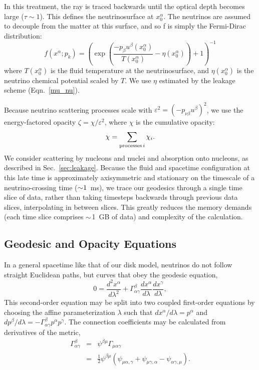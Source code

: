 In this treatment, the ray is traced backwards until the optical depth becomes
large ($\tau\sim1$). This defines the neutrinosurface at $x_0^\alpha$. The
neutrinos are assumed to decouple from the matter at this surface, and so f
is simply the Fermi-Dirac distribution:
\begin{equation}
  \label{eqn:f_fermi_dirac}
  f(x^\alpha;p_k) =
  \left(\exp\left(\frac{-p_\beta u^\beta(x_0^\alpha)}{T(x_0^\alpha)}
  -\eta(x_0^\alpha) \right)+1\right)^{-1}
\end{equation}
where $T(x_0^\alpha)$ is the fluid temperature at the neutrinosurface, and
$\eta(x_0^\alpha)$ is the neutrino chemical potential scaled by $T$.
We use $\eta$ estimated by the leakage scheme (Eqn.~\ref{mu_nu}).

Because neutrino scattering processes scale with
$\varepsilon^2=(-p_{\nu\beta} u^\beta)^2$,
we use the energy-factored opacity $\zeta=\chi/\varepsilon^2$, where $\chi$ is
the cumulative opacity:
\begin{equation}
  \chi = \sum\limits_{{\rm processes}\, i} \chi_i.
\end{equation}
We consider scattering by nucleons and nuclei and absorption onto nucleons,
as described in Sec.~\ref{sec:leakage}.
Because the fluid and spacetime configuration at this late time is approximately
axisymmetric and stationary on the timescale of a neutrino-crossing time
($\mathord{\sim}1$~ms), we trace our geodesics through a single time slice of data,
rather than taking timesteps backwards through previous data slices,
interpolating in between slices. This greatly reduces the memory demands (each
time slice comprises $\mathord{\sim}$1~GB of data) and complexity of the calculation.

\subsection{Geodesic and Opacity Equations}
\label{ssec:geodesic}
In a general spacetime like that of our disk model, neutrinos do not follow
straight Euclidean paths, but curves that obey the geodesic equation,
\begin{equation}
  \label{eqn:geodesic}
  0=\frac{d^2x^\alpha}{d\lambda^2} + \Gamma^\beta_{\alpha\gamma}
  \frac{dx^\alpha}{d\lambda}\frac{dx^\gamma}{d\lambda},
\end{equation}
This second-order equation may be split into two coupled first-order equations
by choosing the affine parameterization $\lambda$ such that
$dx^\alpha/d\lambda=p^\alpha$ and
$dp^\beta/d\lambda=-\Gamma^\beta_{\alpha\gamma}p^\alpha p^\gamma$.
The connection coefficients may be calculated from derivatives of the metric,
\begin{eqnarray}
  \label{eqn:christoffel}
  \Gamma^\beta_{\alpha\gamma}
  &=& \psi^{\beta\mu}\Gamma_{\mu\alpha\gamma} \nonumber \\
  &=& \frac{1}{2} \psi^{\beta\mu}
  (\psi_{\mu\alpha,\gamma} + \psi_{\mu\gamma,\alpha} - \psi_{\alpha\gamma,\mu}).
\end{eqnarray}

